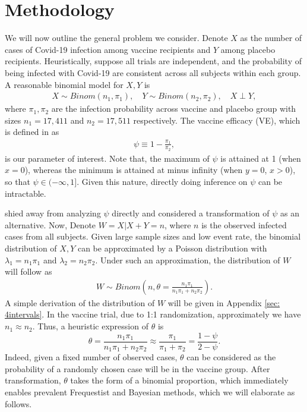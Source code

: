 \documentclass[12pt]{amsart}
\begin{document}
\section{Methodology}
\label{sec: meth}
We will now outline the general problem we consider. Denote $X$ as the number of cases of Covid-19 infection among vaccine recipients and $Y$ among placebo recipients. Heuristically, suppose all trials are independent, and the probability of being infected with Covid-19 are consistent across all subjects within each group. A reasonable binomial model for $X, Y$ is
\begin{align}
    X \sim Binom(n_1, \pi_1), \quad Y \sim Binom(n_2, \pi_2), \quad X \perp Y, 
\end{align}
where $\pi_1, \pi_2$ are the infection probability across vaccine and placebo group with sizes $n_1 = 17,411$ and $n_2 = 17,511$ respectively. 
The vaccine efficacy (VE), which is defined in \cite{paper} as
\begin{align}
    \psi \equiv 1 - \frac{\pi_1}{\pi_2},
\end{align}
is our parameter of interest. Note that, the maximum of $\psi$ is attained at 1 (when $x = 0$), whereas the minimum is attained at minus infinity (when $y = 0$, $x > 0$), so that $\psi \in (-\infty, 1]$. Given this nature, directly doing inference on $\psi$ can be intractable.

\cite{paper} shied away from analyzing $\psi$ directly and considered a transformation of $\psi$ as an alternative. Now, Denote $W = X|X+Y=n$, where $n$ is the observed infected cases from all subjects. Given large sample sizes and low event rate, the binomial distribution of $X, Y$ can be approximated by a Poisson distribution with $\lambda_1 = n_1\pi_1$ and $\lambda_2 = n_2\pi_2$. Under such an approximation, the distribution of $W$ will follow as
\begin{align}
    W \sim Binom \left(n, \theta = \frac{n_1\pi_1}{n_1\pi_1+n_2\pi_2}\right).
\label{eq: W}
\end{align}
A simple derivation of the distribution of $W$ will be given in Appendix \ref{sec: 4intervals}. In the vaccine trial, due to 1:1 randomization, approximately we have $n_1 \approx n_2$. Thus, a heuristic expression of $\theta$ is
\begin{equation}
  \theta =\frac{n_1\pi_1}{n_1\pi_1+n_2\pi_2} \approx \frac{\pi_1}{\pi_1 + \pi_2} = \frac{1 - \psi}{2 - \psi}. 
  \label{eq:theta-psi}
\end{equation}
Indeed, given a fixed number of observed cases, $\theta$ can be considered as the probability of a randomly chosen case will be in the vaccine group. After transformation, $\theta$ takes the form of a binomial proportion, which immediately enables prevalent Frequestist and Bayesian methods, which we will elaborate as follows.
\end{document}
